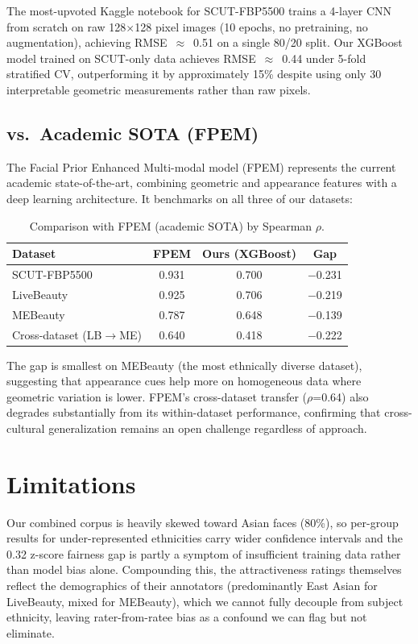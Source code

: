 \documentclass[a4paper,oneside,bibliography=totoc]{scrbook}
\begin{document}
The most-upvoted Kaggle notebook \cite{jhwoo2024kaggle} for SCUT-FBP5500 trains a 4-layer CNN from scratch on raw 128$\times$128 pixel images (10 epochs, no pretraining, no augmentation), achieving RMSE~$\approx$~0.51 on a single 80/20 split. Our XGBoost model trained on SCUT-only data achieves RMSE~$\approx$~0.44 under 5-fold stratified CV, outperforming it by approximately 15\% despite using only 30 interpretable geometric measurements rather than raw pixels.

\subsection{vs.\ Academic SOTA (FPEM)}

The Facial Prior Enhanced Multi-modal model (FPEM) \cite{li2025livebeauty} represents the current academic state-of-the-art, combining geometric and appearance features with a deep learning architecture. It benchmarks on all three of our datasets:

\begin{table}[h]
\centering
\caption{Comparison with FPEM (academic SOTA) by Spearman $\rho$.}
\label{tab:fpem}
\begin{tabular}{lccc}
\toprule
\textbf{Dataset} & \textbf{FPEM} & \textbf{Ours (XGBoost)} & \textbf{Gap} \\
\midrule
SCUT-FBP5500 & 0.931 & 0.700 & $-$0.231 \\
LiveBeauty & 0.925 & 0.706 & $-$0.219 \\
MEBeauty & 0.787 & 0.648 & $-$0.139 \\
Cross-dataset (LB$\rightarrow$ME) & 0.640 & 0.418 & $-$0.222 \\
\bottomrule
\end{tabular}
\end{table}

The gap is smallest on MEBeauty (the most ethnically diverse dataset), suggesting that appearance cues help more on homogeneous data where geometric variation is lower. FPEM's cross-dataset transfer ($\rho$=0.64) also degrades substantially from its within-dataset performance, confirming that cross-cultural generalization remains an open challenge regardless of approach.\\

\section{Limitations}
\label{sec:limitations}

Our combined corpus is heavily skewed toward Asian faces (80\%), so per-group results for under-represented ethnicities carry wider confidence intervals and the 0.32 z-score fairness gap is partly a symptom of insufficient training data rather than model bias alone. Compounding this, the attractiveness ratings themselves reflect the demographics of their annotators (predominantly East Asian for LiveBeauty, mixed for MEBeauty), which we cannot fully decouple from subject ethnicity, leaving rater-from-ratee bias as a confound we can flag but not eliminate.
\end{document}
